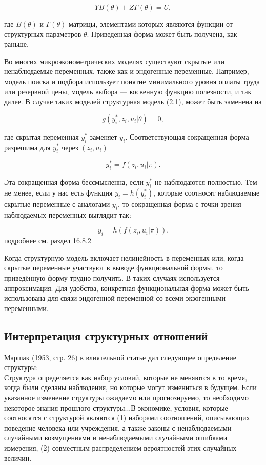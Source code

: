 \begin{equation}
YB(\theta)+Z\Gamma(\theta)=U,
\end{equation}

где $B(\theta)$ и $\Gamma(\theta)$ матрицы, элементами которых являются функции от структурных параметров $\theta$. Приведенная форма может быть получена, как раньше. 


Во многих микроэконометрических моделях существуют скрытые или ненаблюдаемые переменных, также как и эндогенные переменные. Например, модель поиска и подбора  использует понятие минимального уровня оплаты труда или резервной цены, модель выбора --- косвенную функцию полезности, и так далее. В случае таких моделей структурная модель (2.1), может быть заменена на

\begin{equation}
g(y^{\ast}_{i},z_{i},u_{i}|\theta)=0,
\end{equation}

где скрытая переменная $y^{\ast}_{i}$ заменяет $y_{i}$. Соответствующая сокращенная форма разрешима для $y^{\ast}_{i}$ через $(z_{i},u_{i})$

\begin{equation}
y^{\ast}_{i}=f(z_{i},u_{i}|\pi).
\end{equation}


Эта сокращенная форма бессмысленна, если $y^{\ast}_{i}$ не наблюдаются полностью. Тем не менее, если у нас есть функция $y_{i}=h(y^{\ast}_{i})$, которые соотносят наблюдаемые скрытые переменные с аналогами $y_{i}$, то сокращенная форма с точки зрения наблюдаемых переменных выглядит так:

\begin{equation}
y_{i}=h(f(z_{i},u_{i}|\pi)).
\end{equation}
подробнее см. раздел 16.8.2


Когда структурную модель включает нелинейность в переменных или, когда скрытые переменные участвуют в выводе функциональной формы, то приведённую форму трудно получить. В таких случаях используется аппроксимация. Для удобства, конкретная функциональная форма может быть использована для связи эндогенной переменной со всеми экзогенными переменными.



\subsection{Интерпретация структурных отношений}


Маршак (1953, стр. 26) в влиятельной статье дал следующее определение структуры: \\
Структура определяется как набор условий, которые не меняются в то время, когда были сделаны наблюдения, но которые могут измениться в будущем. Если указанное изменение структуры ожидаемо или прогнозируемо, то необходимо  некоторое знания прошлого структуры...В экономике, условия, которые соотносятся с структурой являются (1) наборами соотношений, описывающих поведение человека или учреждения, а также законы с ненаблюдаемыми случайными возмущениями и ненаблюдаемыми случайными ошибками измерения, (2) совместным распределением вероятностей этих случайных величин. 


